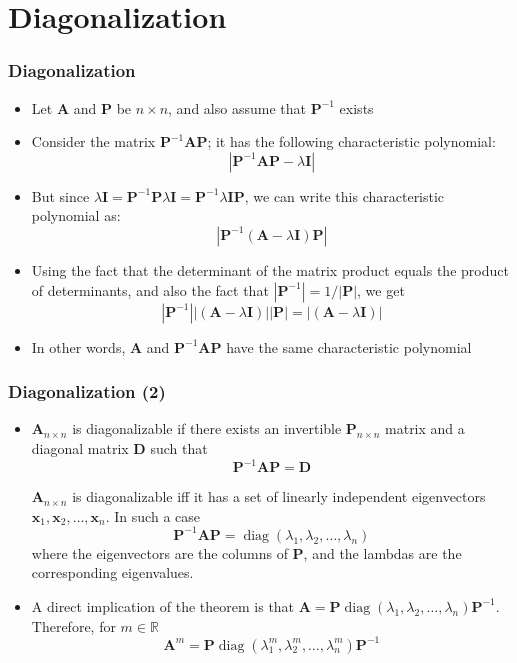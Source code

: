 \documentclass[10pt]{beamer}
\DeclareMathOperator{\diag}{diag}
\theoremstyle{definition}
\begin{document}
\section{Diagonalization}
\begin{frame}[fragile]
\frametitle{Diagonalization}
\begin{itemize}
	\item Let $\mathbf{A}$ and $\mathbf{P}$ be $n\times n$, and also assume that $\mathbf{P}^{-1}$ exists
	\item Consider the matrix $\mathbf{P}^{-1}\mathbf{AP}$; it has the following characteristic polynomial:
	\[
		|\mathbf{P}^{-1}\mathbf{AP} - \lambda \mathbf{I}|
	\]
	\item But since $\lambda \mathbf{I} = \mathbf{P}^{-1}\mathbf{P}\lambda \mathbf{I} = \mathbf{P}^{-1}\lambda \mathbf{I}\mathbf{P}$, we can write this characteristic polynomial as:
	\[
		|\mathbf{P}^{-1}(\mathbf{A} - \lambda \mathbf{I})\mathbf{P}|
	\]
	\item Using the fact that the determinant of the matrix product equals the product of determinants, and also the fact that $|\mathbf{P}^{-1}| = 1/|\mathbf{P}|$, we get
	\[
		|\mathbf{P}^{-1}||(\mathbf{A} - \lambda \mathbf{I})||\mathbf{P}| = |(\mathbf{A} - \lambda \mathbf{I})|
	\]
	\item In other words, $\mathbf{A}$ and $\mathbf{P}^{-1}\mathbf{AP}$ have the same characteristic polynomial
\end{itemize}
\end{frame}

\begin{frame}[fragile]
\frametitle{Diagonalization (2)}
\begin{itemize}
	\item $\mathbf{A}_{n\times n}$ is diagonalizable if there exists an invertible $\mathbf{P}_{n\times n}$ matrix and a diagonal matrix $\mathbf{D}$ such that
	\[
		\mathbf{P}^{-1}\mathbf{AP} = \mathbf{D}
	\]
	\begin{theorem}
		$\mathbf{A}_{n\times n}$ is diagonalizable iff it has a set of linearly independent eigenvectors $\mathbf{x}_{1}, \mathbf{x}_{2},\ldots, \mathbf{x}_{n}$. In such a case
		\[
			\mathbf{P}^{-1}\mathbf{AP} = \diag(\lambda_{1},\lambda_{2},\ldots,\lambda_{n})
		\]
		where the eigenvectors are the columns of $\mathbf{P}$, and the lambdas are the corresponding eigenvalues.
	\end{theorem}
	\item A direct implication of the theorem is that $\mathbf{A} = \mathbf{P}\diag(\lambda_{1},\lambda_{2},\ldots,\lambda_{n})\mathbf{P}^{-1}$. Therefore, for $m \in \mathbb{R}$
	\[
		\mathbf{A}^{m} = \mathbf{P}\diag(\lambda_{1}^{m},\lambda_{2}^{m},\ldots,\lambda_{n}^{m})\mathbf{P}^{-1}
	\]
\end{itemize}
\end{frame}
\end{document}
